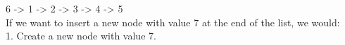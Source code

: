 \documentclass[preview]{standalone}
\begin{document}
6 -> 1 -> 2 -> 3 -> 4 -> 5\\If we want to insert a new node with value 7 at the end of the list, we would:\\1. Create a new node with value 7.\\
\end{document}
